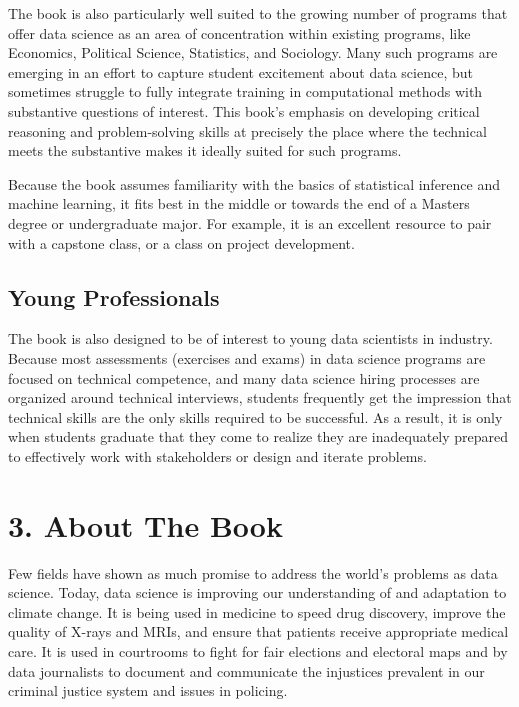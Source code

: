 \documentclass[12pt]{article}
\begin{document}
The book is also particularly well suited to the growing number of
programs that offer data science as an area of concentration within
existing programs, like Economics, Political Science, Statistics, and
Sociology. Many such programs are emerging in an effort to capture
student excitement about data science, but sometimes struggle to fully
integrate training in computational methods with substantive questions
of interest. This book's emphasis on developing critical reasoning and
problem-solving skills at precisely the place where the technical meets
the substantive makes it ideally suited for such programs.

Because the book assumes familiarity with the basics of statistical
inference and machine learning, it fits best in the middle or towards
the end of a Masters degree or undergraduate major. For example, it is
an excellent resource to pair with a capstone class, or a class on
project development.

\subsection*{Young Professionals}\label{young-professionals}

The book is also designed to be of interest to young data scientists in
industry. Because most assessments (exercises and exams) in data science
programs are focused on technical competence, and many data science
hiring processes are organized around technical interviews, students
frequently get the impression that technical skills are the only skills
required to be successful. As a result, it is only when students
graduate that they come to realize they are inadequately prepared to
effectively work with stakeholders or design and iterate problems.

\section*{3. About The Book}\label{about-the-book}

Few fields have shown as much promise to address the world's problems as
data science. Today, data science is improving our understanding of and
adaptation to climate change. It is being used in medicine to speed drug
discovery, improve the quality of X-rays and MRIs, and ensure that
patients receive appropriate medical care. It is used in courtrooms to
fight for fair elections and electoral maps and by data journalists to
document and communicate the injustices prevalent in our criminal
justice system and issues in policing.
\end{document}

